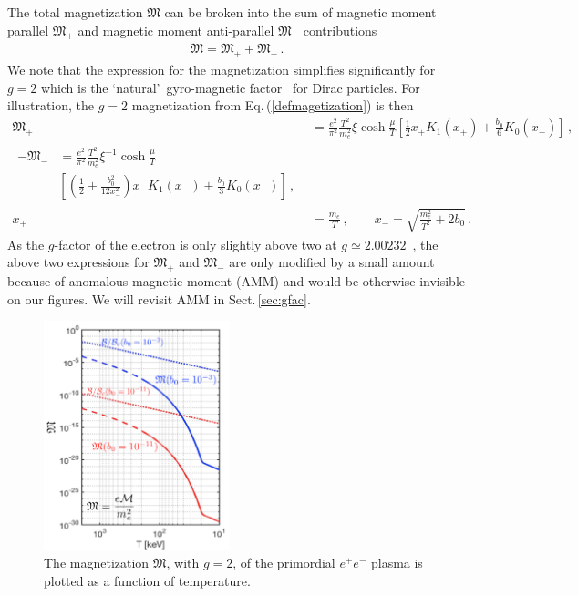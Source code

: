 \documentclass[aps,prd,floatfix,reprint]{revtex4-2}
\newcommand{\req}[1]{Eq.\,(\ref{#1})}
\newcommand{\rsec}[1]{Sect.\,{\ref{#1}}}
\begin{document}
The total magnetization ${\mathfrak M}$ can be broken into the sum of magnetic moment parallel ${\mathfrak M}_{+}$ and magnetic moment anti-parallel ${\mathfrak M}_{-}$ contributions
\begin{align}
\label{g2mag}
{\mathfrak M}={\mathfrak M}_{+}+{\mathfrak M}_{-}\,.
\end{align}
We note that the expression for the magnetization simplifies significantly for $g=2$ which is the \lq natural\rq\ gyro-magnetic factor~\cite{Evans:2022fsu,Rafelski:2022bsv} for Dirac particles. For illustration, the $g=2$ magnetization from \req{defmagetization} is then
\begin{align}
 \label{g2magplus}
 {\mathfrak M}_{+}&=\frac{e^{2}}{\pi^{2}}\frac{T^{2}}{m_{e}^{2}}\xi\cosh{\frac{\mu}{T}}\left[\frac{1}{2}x_{+}K_{1}(x_{+})+\frac{b_{0}}{6}K_{0}(x_{+})\right]\,,\\
\begin{split}  
 \label{g2magminus}
 -{\mathfrak M}_{-}&=\frac{e^{2}}{\pi^{2}}\frac{T^{2}}{m_{e}^{2}}\xi^{-1}\cosh{\frac{\mu}{T}}\\
 &\left[\left(\frac{1}{2}+\frac{b_{0}^{2}}{12x_{-}^{2}}\right)x_{-}K_{1}(x_{-})+\frac{b_{0}}{3}K_{0}(x_{-})\right]\,,
\end{split}\\
 x_{+}&=\frac{m_{e}}{T}\,,\qquad
 x_{-}=\sqrt{\frac{m_{e}^{2}}{T^{2}}+2b_{0}}\,.
\end{align}
As the $g$-factor of the electron is only slightly above two at $g\simeq2.00232$~\cite{Tiesinga:2021myr}, the above two expressions for ${\mathfrak M}_{+}$ and ${\mathfrak M}_{-}$ are only modified by a small amount because of anomalous magnetic moment (AMM) and would be otherwise invisible on our figures. We will revisit AMM in \rsec{sec:gfac}.

\begin{figure}[ht]
 \centering
 \includegraphics[width=0.48\textwidth]{plots/Magnetization_Hc_new004.png}
 \caption{The magnetization ${\mathfrak M}$, with $g=2$, of the primordial $e^{+}e^{-}$ plasma is plotted as a function of temperature.}
 \label{fig:magnet} 
\end{figure}
\end{document}
